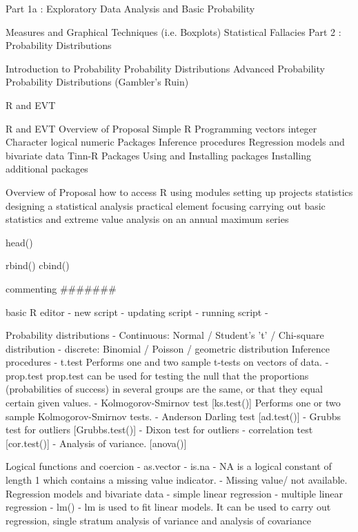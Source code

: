 
\tableofcontents

Part 1a : Exploratory Data Analysis and Basic Probability

Measures and Graphical Techniques (i.e. Boxplots)
Statistical Fallacies
Part 2 : Probability Distributions

Introduction to Probability
Probability Distributions
Advanced Probability
Probability Distributions (Gambler's Ruin)






R and EVT

R and EVT
Overview of Proposal
Simple R Programming
vectors
integer
Character
logical
numeric
Packages
Inference procedures
Regression models and bivariate data
Tinn-R
Packages
Using and Installing packages
Installing additional packages

Overview of Proposal
how to access R
using modules
setting up projects
statistics
designing a statistical analysis
practical element focusing carrying out basic statistics and extreme value analysis on an annual maximum series
 
 
head()

rbind()
cbind()




commenting #######


basic R editor
 - new script
 - updating script
 - running script
 -
 
Probability distributions
 - Continuous: Normal / Student's 't' / Chi-square distribution
 - discrete: Binomial / Poisson / geometric distribution
Inference procedures
 - t.test
Performs one and two sample t-tests on vectors of data. 
 - prop.test
    prop.test can be used for testing the null that the proportions (probabilities of success) in several groups are the same, or that they equal certain given values.
 - Kolmogorov-Smirnov test      [ks.test()]
Performs one or two sample Kolmogorov-Smirnov tests. 
 - Anderson Darling test        [ad.test()]
 - Grubbs test for outliers     [Grubbs.test()]
 - Dixon test for outliers
 - correlation test [cor.test()]
 - Analysis of variance. [anova()]
 

Logical functions and coercion
 - as.vector
 - is.na
 - NA is a logical constant of length 1 which contains a missing value indicator.
 - Missing value/ not available. 
Regression models and bivariate data
 - simple linear regression 
 - multiple linear regression 
 - lm()
 - lm is used to fit linear models. It can be used to carry out regression, single stratum analysis of variance and analysis of covariance 

